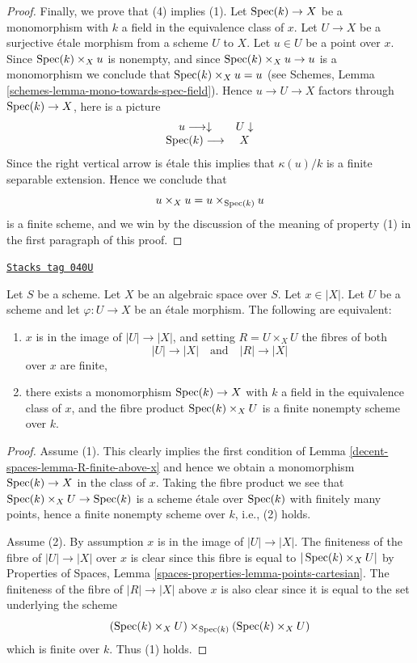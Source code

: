 \begin{proof}
\medskip\noindent
Finally, we prove that (4) implies (1). Let $\operatorname{Spec}(k) \to X$
be a monomorphism with $k$ a field in the equivalence class of $x$.
Let $U \to X$ be a surjective \'etale morphism from a scheme $U$ to $X$.
Let $u \in U$ be a point over $x$. Since $\operatorname{Spec}(k) \times_X u$
is nonempty, and since $\operatorname{Spec}(k) \times_X u \to u$ is a monomorphism
we conclude that $\operatorname{Spec}(k) \times_X u = u$ (see
Schemes, Lemma \ref{schemes-lemma-mono-towards-spec-field}).
Hence $u \to U \to X$ factors through $\operatorname{Spec}(k) \to X$, here is
a picture
$$
\begin{array}{cc}u \longrightarrow\downarrow & U \downarrow \\ \operatorname{Spec}(k) \longrightarrow & X\end{array}
$$
Since the right vertical arrow is \'etale this implies that
$\kappa(u)/k$ is a finite separable extension. Hence we conclude that
$$
u \times_X u = u \times_{\operatorname{Spec}(k)} u
$$
is a finite scheme, and we win by the discussion of the meaning of property
(1) in the first paragraph of this proof.
\end{proof}

\begin{lemma}
\label{decent-spaces-lemma-weak-UR-finite-above-x}
\href{https://stacks.math.columbia.edu/tag/040U}{\texttt{Stacks tag 040U}}

Let $S$ be a scheme. Let $X$ be an algebraic space over $S$.
Let $x \in |X|$.
Let $U$ be a scheme and let $\varphi : U \to X$ be an \'etale morphism.
The following are equivalent:
\begin{enumerate}
\item $x$ is in the image of $|U| \to |X|$, and
setting $R = U \times_X U$ the fibres of both
$$
|U| \longrightarrow |X|
\quad\text{and}\quad
|R| \longrightarrow |X|
$$
over $x$ are finite,
\item there exists a monomorphism $\operatorname{Spec}(k) \to X$ with $k$ a field
in the equivalence class of $x$, and
the fibre product $\operatorname{Spec}(k) \times_X U$ is
a finite nonempty scheme over $k$.
\end{enumerate}
\end{lemma}

\begin{proof}
Assume (1). This clearly implies the first condition of
Lemma \ref{decent-spaces-lemma-R-finite-above-x} and hence we obtain a monomorphism
$\operatorname{Spec}(k) \to X$ in the class of $x$. Taking the fibre product
we see that $\operatorname{Spec}(k) \times_X U \to \operatorname{Spec}(k)$ is a scheme
\'etale over $\operatorname{Spec}(k)$ with finitely many points, hence a finite
nonempty scheme over $k$, i.e., (2) holds.

\medskip\noindent
Assume (2). By assumption $x$ is in the image of
$|U| \to |X|$. The finiteness of the fibre of
$|U| \to |X|$ over $x$ is clear since this fibre is equal to
$|\operatorname{Spec}(k) \times_X U|$ by
Properties of Spaces,
Lemma \ref{spaces-properties-lemma-points-cartesian}.
The finiteness of the fibre of $|R| \to |X|$ above $x$ is also clear
since it is equal to the set underlying the scheme
$$
(\operatorname{Spec}(k) \times_X U) \times_{\operatorname{Spec}(k)} (\operatorname{Spec}(k) \times_X U)
$$
which is finite over $k$. Thus (1) holds.
\end{proof}

